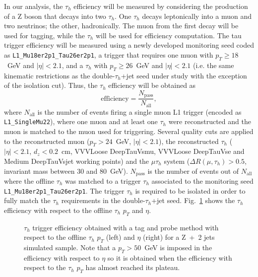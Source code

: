 \documentclass[../main.tex]{subfiles}
\begin{document}
In our analysis, the $\tau_h$ efficiency will be measured by considering the production of a Z boson that decays into two $\tau_h$. One $\tau_h$ decays leptonically into a muon and two neutrinos; the other, hadronically. The muon from the first decay will be used for tagging, while the $\tau_h$ will be used for efficiency computation. The tau trigger efficiency will be measured using a newly developed monitoring seed coded as \texttt{L1\_Mu18er2p1\_Tau26er2p1}, a trigger that requires one muon with $p_T\geq18$~GeV and $|\eta|<2.1$, and a $\tau_h$ with $p_T\geq26$~GeV and $|\eta|<2.1$ (i.e. the same kinematic restrictions as the double-$\tau_h$+jet seed under study with the exception of the isolation cut). Thus, the $\tau_h$ efficiency will be obtained as
\begin{equation}
\text{efficiency} = \frac{N_\text{pass}}{N_\text{all}},
\end{equation}
where $N_\text{all}$ is the number of events firing a single muon L1 trigger (encoded as \texttt{L1\_SingleMu22}), where one muon and at least one $\tau_h$ were reconstructed and the muon is matched to the muon used for triggering. Several quality cuts are applied to the reconstructed muon ($p_T>24$~GeV, $|\eta|<2.1$), the reconstructed $\tau_h$ ($|\eta|<2.1$, $d_z<0.2$~cm, VVVLoose DeepTauVsmu, VVVLoose DeepTauVse and Medium DeepTauVsjet working points) and the $\mu\tau_h$ system ($\Delta R(\mu, \tau_h) > 0.5$, invariant mass between 30 and 80~GeV). $N_\text{pass}$ is the number of events out of $N_\text{all}$ where the offline $\tau_h$ was matched to a trigger $\tau_h$ associated to the monitoring seed \texttt{L1\_Mu18er2p1\_Tau26er2p1}. The trigger $\tau_h$ is required to be isolated in order to fully match the $\tau_h$ requirements in the double-$\tau_h$+jet seed. Fig.~\ref{hh:fig:l1_eff_tauleg} shows the $\tau_h$ efficiency with respect to the offline $\tau_h$ $p_T$ and $\eta$.

\begin{figure}[h!]
\begin{center}
\end{center}
\caption{$\tau_h$ trigger efficiency obtained with a tag and probe method with respect to the offline $\tau_h$ $p_T$ (left) and $\eta$ (right) for a Z~+~2 jets simulated sample. Note that a $p_T>50$~GeV is imposed in the efficiency with respect to $\eta$ so it is obtained when the efficiency with respect to the $\tau_h$ $p_T$ has almost reached its plateau. }
\label{hh:fig:l1_eff_tauleg}
\end{figure}
\end{document}
